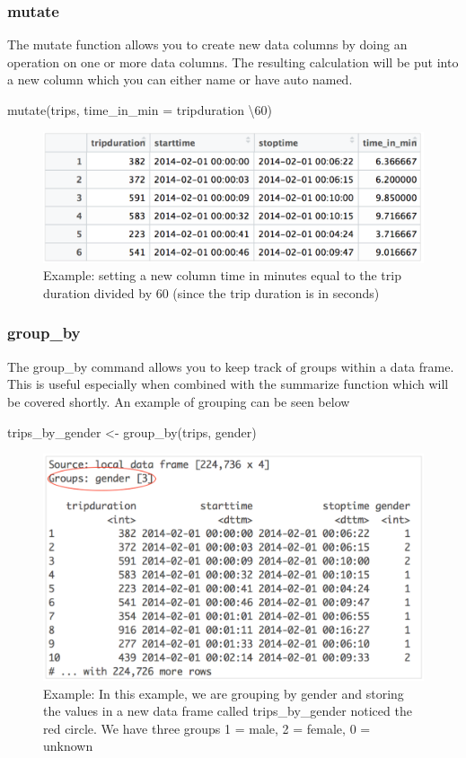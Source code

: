 \subsubsection{mutate}
\begin{flushleft}
The mutate function allows you to create new data columns by doing an operation on one or more data columns. The resulting calculation will be put into a new column which you can either name or have auto named. 
\end{flushleft}

\begin{center}
mutate(trips, time\_in\_min = tripduration \textbackslash 60)
\end{center}

\begin{figure}[h]
    \centering
    \includegraphics[width=.75\textwidth]{figures/mutate_trips_ex.png}
    \caption{Example: setting a new column time in minutes equal to the trip duration divided by 60 (since the trip duration is in seconds)}
    \label{fig:mutate_trips_ex}
\end{figure}


\subsubsection{group\_by}
\begin{flushleft}
The group\_by command allows you to keep track of groups within a data frame. This is useful especially when combined with the summarize function which will be covered shortly. An example of grouping can be seen below
\end{flushleft}

\begin{center}
trips\_by\_gender <- group\_by(trips, gender)
\end{center}    

\begin{figure}[h]
    \centering
    \includegraphics[width=.75\textwidth]{figures/group_by_gender.png}
    \caption{Example: In this example, we are grouping by gender and storing the values in a new data frame called trips\_by\_gender noticed the red circle. We have three groups 1 = male, 2 = female, 0 = unknown}
    \label{fig:group_by_gender}
\end{figure}

